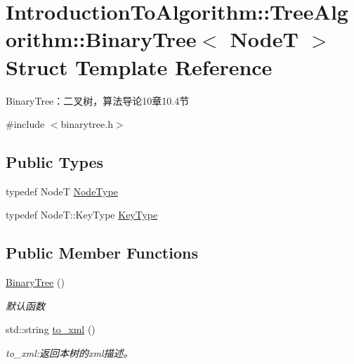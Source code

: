 \hypertarget{struct_introduction_to_algorithm_1_1_tree_algorithm_1_1_binary_tree}{}\section{Introduction\+To\+Algorithm\+:\+:Tree\+Algorithm\+:\+:Binary\+Tree$<$ Node\+T $>$ Struct Template Reference}
\label{struct_introduction_to_algorithm_1_1_tree_algorithm_1_1_binary_tree}


Binary\+Tree：二叉树，算法导论10章10.4节  




{\ttfamily \#include $<$binarytree.\+h$>$}

\subsection*{Public Types}
\begin{DoxyCompactItemize}
\item 
typedef Node\+T \hyperlink{struct_introduction_to_algorithm_1_1_tree_algorithm_1_1_binary_tree_a9a441f3f41c5b69758204ba60fe02010}{Node\+Type}
\item 
typedef Node\+T\+::\+Key\+Type \hyperlink{struct_introduction_to_algorithm_1_1_tree_algorithm_1_1_binary_tree_af231d881ec1d08492b2b5b5638e5e373}{Key\+Type}
\end{DoxyCompactItemize}
\subsection*{Public Member Functions}
\begin{DoxyCompactItemize}
\item 
\hyperlink{struct_introduction_to_algorithm_1_1_tree_algorithm_1_1_binary_tree_adc9b1c18fd12ab56de09e92005848abf}{Binary\+Tree} ()
\begin{DoxyCompactList}\small\item\em 默认函数 \end{DoxyCompactList}\item 
std\+::string \hyperlink{struct_introduction_to_algorithm_1_1_tree_algorithm_1_1_binary_tree_a96fa515f1c3b4176a03c37b8ea582339}{to\+\_\+xml} ()
\begin{DoxyCompactList}\small\item\em to\+\_\+xml\+:返回本树的{\ttfamily xml}描述。 \end{DoxyCompactList}\end{DoxyCompactItemize}
